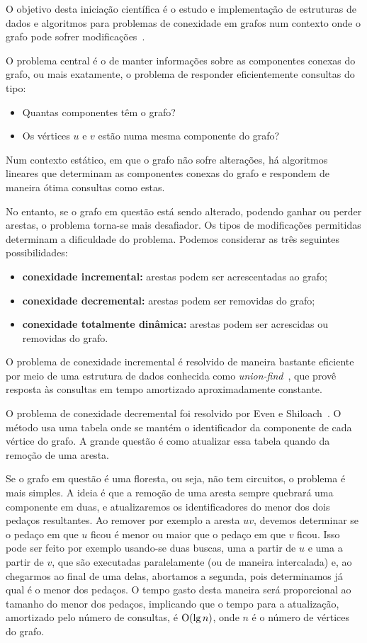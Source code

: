 O objetivo desta iniciação científica é o estudo e implementação de estruturas de dados e algoritmos 
para problemas de conexidade em grafos num contexto onde o grafo pode sofrer 
modificações~\cite{DemetrescuFI2004}.  

O problema central é o de manter informações sobre as componentes conexas do grafo, 
ou mais exatamente, o problema de responder eficientemente consultas do tipo: 
\begin{itemize}
\item Quantas componentes têm o grafo?
\item Os vértices $u$ e $v$ estão numa mesma componente do grafo?
\end{itemize}

Num contexto estático, em que o grafo não sofre alterações, há algoritmos lineares que 
determinam as componentes conexas do grafo e respondem de maneira ótima consultas como estas.

No entanto, se o grafo em questão está sendo alterado, podendo ganhar ou perder arestas, 
o problema torna-se mais desafiador.  Os tipos de modificações permitidas determinam 
a dificuldade do problema.  Podemos considerar as três seguintes possibilidades: 
\begin{itemize}
\item {\bf conexidade incremental:} arestas podem ser acrescentadas ao grafo; 
\item {\bf conexidade decremental:} arestas podem ser removidas do grafo;
\item {\bf conexidade totalmente dinâmica:} arestas podem ser acrescidas ou removidas do grafo.
\end{itemize}

O problema de conexidade incremental é resolvido de maneira bastante eficiente por meio de 
uma estrutura de dados conhecida como \emph{union-find}~\cite{Tarjan1975}, que provê resposta 
às consultas em tempo amortizado aproximadamente constante. 

O problema de conexidade decremental foi resolvido por Even e Shiloach~\cite{EvenS1981}.  
O método usa uma tabela onde se mantém o identificador da componente de cada vértice do grafo.  
A grande questão é como atualizar essa tabela quando da remoção de uma aresta. 

Se o grafo em questão é uma floresta, ou seja, não tem circuitos, o problema é mais simples.  
A ideia é que a remoção de uma aresta sempre quebrará uma componente em duas, e atualizaremos
os identificadores do menor dos dois pedaços resultantes.  Ao remover por exemplo a aresta $uv$, 
devemos determinar se o pedaço em que $u$ ficou é menor ou maior que o pedaço em que $v$ ficou.  
Isso pode ser feito por exemplo usando-se duas buscas, uma a partir de $u$ e uma a partir de $v$, 
que são executadas paralelamente (ou de maneira intercalada) e, ao chegarmos ao final de uma delas, 
abortamos a segunda, pois determinamos já qual é o menor dos pedaços.  O tempo gasto desta maneira 
será proporcional ao tamanho do menor dos pedaços, implicando que o tempo para a atualização, 
amortizado pelo número de consultas, é $\mathrm{O}(\lg n)$, onde $n$ é o número de vértices do grafo.

